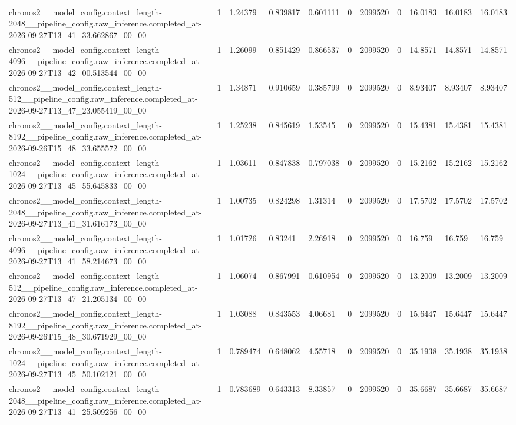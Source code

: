 \begin{tabular}{lllllllllll}
chronos2\_\_model\_config.context\_length-2048\_\_pipeline\_config.raw\_inference.completed\_at-2026-09-27T13\_41\_33.662867\_00\_00 & 1 & 1.24379 & 0.839817 & 0.601111 & 0 & 2099520 & 0 & 16.0183 & 16.0183 & 16.0183 \\
chronos2\_\_model\_config.context\_length-4096\_\_pipeline\_config.raw\_inference.completed\_at-2026-09-27T13\_42\_00.513544\_00\_00 & 1 & 1.26099 & 0.851429 & 0.866537 & 0 & 2099520 & 0 & 14.8571 & 14.8571 & 14.8571 \\
chronos2\_\_model\_config.context\_length-512\_\_pipeline\_config.raw\_inference.completed\_at-2026-09-27T13\_47\_23.055419\_00\_00 & 1 & 1.34871 & 0.910659 & 0.385799 & 0 & 2099520 & 0 & 8.93407 & 8.93407 & 8.93407 \\
chronos2\_\_model\_config.context\_length-8192\_\_pipeline\_config.raw\_inference.completed\_at-2026-09-26T15\_48\_33.655572\_00\_00 & 1 & 1.25238 & 0.845619 & 1.53545 & 0 & 2099520 & 0 & 15.4381 & 15.4381 & 15.4381 \\
chronos2\_\_model\_config.context\_length-1024\_\_pipeline\_config.raw\_inference.completed\_at-2026-09-27T13\_45\_55.645833\_00\_00 & 1 & 1.03611 & 0.847838 & 0.797038 & 0 & 2099520 & 0 & 15.2162 & 15.2162 & 15.2162 \\
chronos2\_\_model\_config.context\_length-2048\_\_pipeline\_config.raw\_inference.completed\_at-2026-09-27T13\_41\_31.616173\_00\_00 & 1 & 1.00735 & 0.824298 & 1.31314 & 0 & 2099520 & 0 & 17.5702 & 17.5702 & 17.5702 \\
chronos2\_\_model\_config.context\_length-4096\_\_pipeline\_config.raw\_inference.completed\_at-2026-09-27T13\_41\_58.214673\_00\_00 & 1 & 1.01726 & 0.83241 & 2.26918 & 0 & 2099520 & 0 & 16.759 & 16.759 & 16.759 \\
chronos2\_\_model\_config.context\_length-512\_\_pipeline\_config.raw\_inference.completed\_at-2026-09-27T13\_47\_21.205134\_00\_00 & 1 & 1.06074 & 0.867991 & 0.610954 & 0 & 2099520 & 0 & 13.2009 & 13.2009 & 13.2009 \\
chronos2\_\_model\_config.context\_length-8192\_\_pipeline\_config.raw\_inference.completed\_at-2026-09-26T15\_48\_30.671929\_00\_00 & 1 & 1.03088 & 0.843553 & 4.06681 & 0 & 2099520 & 0 & 15.6447 & 15.6447 & 15.6447 \\
chronos2\_\_model\_config.context\_length-1024\_\_pipeline\_config.raw\_inference.completed\_at-2026-09-27T13\_45\_50.102121\_00\_00 & 1 & 0.789474 & 0.648062 & 4.55718 & 0 & 2099520 & 0 & 35.1938 & 35.1938 & 35.1938 \\
chronos2\_\_model\_config.context\_length-2048\_\_pipeline\_config.raw\_inference.completed\_at-2026-09-27T13\_41\_25.509256\_00\_00 & 1 & 0.783689 & 0.643313 & 8.33857 & 0 & 2099520 & 0 & 35.6687 & 35.6687 & 35.6687 \\

\end{tabular}

